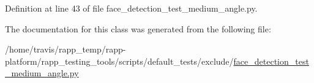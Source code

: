 Definition at line 43 of file face\-\_\-detection\-\_\-test\-\_\-medium\-\_\-angle.\-py.



The documentation for this class was generated from the following file\-:\begin{DoxyCompactItemize}
\item 
/home/travis/rapp\-\_\-temp/rapp-\/platform/rapp\-\_\-testing\-\_\-tools/scripts/default\-\_\-tests/exclude/\hyperlink{face__detection__test__medium__angle_8py}{face\-\_\-detection\-\_\-test\-\_\-medium\-\_\-angle.\-py}\end{DoxyCompactItemize}
